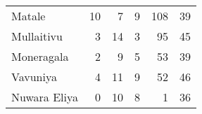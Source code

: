 \begin{tabular}{lrrrrr}
Matale       &          10 &           7 &            9 &              108 &          39 \\
Mullaitivu   &           3 &          14 &            3 &               95 &          45 \\
Moneragala   &           2 &           9 &            5 &               53 &          39 \\
Vavuniya     &           4 &          11 &            9 &               52 &          46 \\
Nuwara Eliya &           0 &          10 &            8 &                1 &          36 \\
\bottomrule
\end{tabular}
